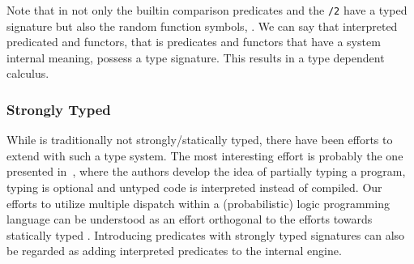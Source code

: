 Note that in \dcproblogsty not only the builtin comparison predicates and the \lstinline[columns=fixed]|/2| have a typed signature but also the random function symbols, \eg {}. We can say that interpreted predicated and functors, that is predicates and functors that have a system internal meaning, possess a type signature. This results in a type dependent calculus.




\subsubsection*{Strongly Typed \prologsty}

While \prologsty is traditionally not strongly/statically typed, there have been efforts to extend \prologsty with such a type system. The most interesting effort is probably the one presented in~\citet{Schrijvers2008TowardsTP}, where the authors develop the idea of partially typing a \prologsty program, \ie typing is optional and untyped code is interpreted instead of compiled.  Our efforts to utilize multiple dispatch within a (probabilistic) logic programming language can be understood as an effort orthogonal to the efforts towards statically typed \prologsty. Introducing predicates with strongly typed signatures can also be regarded as adding interpreted predicates to the internal \prologsty engine. 
